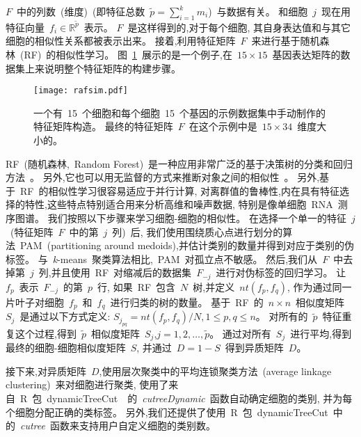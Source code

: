 $F$~中的列数~(维度)~(即特征总数~$\tilde {p} = \sum_{i = 1}^{k} m_{i}$)~与数据有关。
和细胞~$j$~现在用特征向量~$f_{i} \in \mathbb {R} ^ {\tilde{p}}$~表示。
$F$~是这样得到的,对于每个细胞,
其自身表达值和与其它细胞的相似性关系都被表示出来。
接着,利用特征矩阵~$F$~来进行基于随机森林~(RF)~的相似性学习。
图~\ref{fig:rafsim}~展示的是一个例子,在~$15 \times 15$~基因表达矩阵的数据集上来说明整个特征矩阵的构建步骤。
\begin{figure}[!htbp]
    \centering
    \texttt{[image: rafsim.pdf]}
    \caption{
        一个有~15~个细胞和每个细胞~15~个基因的示例数据集中手动制作的特征矩阵构造。
        最终的特征矩阵~$F$~在这个示例中是~$15\times34$~维度大小的。
    }
    \label{fig:rafsim}
\end{figure}

RF~(随机森林,~Random Forest)~是一种应用非常广泛的基于决策树的分类和回归方法~\cite{breiman2001random}。
另外,它也可以用无监督的方式来推断对象之间的相似性~\cite{shi2006unsupervised,breiman2011manual,pouyan2018random}。
另外,基于~RF~的相似性学习很容易适应于并行计算,
对离群值的鲁棒性,内在具有特征选择的特性,这些特点特别适合用来分析高维和噪声数据,
特别是像单细胞~RNA~测序图谱。
我们按照以下步骤来学习细胞-细胞的相似性。
在选择一个单一的特征~$j$~(特征矩阵~$F$~中的第~$j$~列)~后, 
我们使用围绕质心点进行划分的算法~PAM~(partitioning around medoids),并估计类别的数量并得到对应于类别的伪标签。
与~\textit{k}-means~聚类算法相比,~PAM~对孤立点不敏感。
然后,我们从~$F$~中去掉第~$j$~列,并且使用~RF~对缩减后的数据集~$F_{-j}$~进行对伪标签的回归学习。
让~$f_p$~表示~$F_{-j}$~的第~$p$~行,
如果~RF~包含~$N$~树,并定义~$nt(f_p,f_q)$, 作为通过同一片叶子对细胞~$f_p$~和~$f_q$~进行归类的树的数量。
基于~RF~的~$n \times n$~相似度矩阵~$S_j$~是通过以下方式定义:
$S_{j_{pq}} = nt(f_p,f_q) / N, 1 \le p,q \le n$。
对所有的~$\tilde{p}$~特征重复这个过程,得到~$\tilde{p}$~相似度矩阵~$S_j$,$j=1,2,\ldots,\tilde{p}$。
通过对所有~$S_j$~进行平均,得到最终的细胞-细胞相似度矩阵~$S$,
并通过~$D=1-S$~得到异质矩阵~$D$。

接下来,对异质矩阵~$D$,使用层次聚类中的平均连锁聚类方法~(average linkage clustering)~来对细胞进行聚类,
使用了来自~R~包~dynamicTreeCut~\cite{langfelder2007defining,package-dynamicTreeCut}~的~\textit{cutreeDynamic}~函数自动确定细胞的类别,
并为每个细胞分配正确的类标签。
另外,我们还提供了使用~R~包~dynamicTreeCut~中的~\textit{cutree}~函数来支持用户自定义细胞的类别数。

